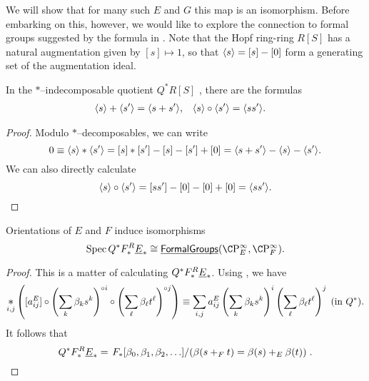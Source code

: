 We will show that for many such $E$ and $G$ this map is an isomorphism.  Before embarking on this, however, we would like to explore the connection to formal groups suggested by the formula in .  Note that the Hopf ring-ring $R[S]$ has a natural augmentation given by $[s] \mapsto 1$, so that $\langle s\rangle = [s] - [0]$ form a generating set of the augmentation ideal.
\begin{lemma}\label{ArithmeticInQAst}
In the $\ast$--indecomposable quotient $Q^* R[S]$ , there are the formulas
\begin{align*}
\langle s\rangle + \langle s'\rangle & = \langle s + s'\rangle, &
\langle s\rangle \circ \langle s'\rangle & = \langle s s'\rangle.
\end{align*}
\end{lemma}

\begin{proof}
Modulo $\ast$--decomposables, we can write  \[0 \equiv \langle s\rangle \ast \langle s'\rangle = [s] \ast [s'] - [s] - [s'] + [0] = \langle s + s'\rangle - \langle s\rangle - \langle s'\rangle.\]  We can also directly calculate \[\langle s\rangle \circ \langle s'\rangle = [s s'] - [0] - [0] + [0] = \langle s s'\rangle. \qedhere\]
\end{proof}

\begin{corollary}
Orientations of $E$ and $F$ induce isomorphisms
\[\Spec Q^* F_*^R \OS{E}{*} \cong \InternalHom{FormalGroups}(\CP^\infty_E, \CP^\infty_F).\]
\end{corollary}
\begin{proof}
This is a matter of calculating $Q^* F_*^R \underline{\smash{E}}_{*}$.  Using , we have \[\bigast_{i, j} \left([a_{ij}^E] \circ \left( \sum_k \beta_k s^k \right)^{\circ i} \circ \left( \sum_\ell \beta_\ell t^\ell \right)^{\circ j} \right) \equiv \sum_{i, j} a_{ij}^E \left( \sum_k \beta_k s^k \right)^i \left( \sum_\ell \beta_\ell t^\ell \right)^j \;\text{(in $Q^*$)}.\]  It follows that \[Q^* F_*^R \underline{\smash{E}}_{*} = \left. F_*[\beta_0, \beta_1, \beta_2, \ldots] \middle/ \left( \beta(s +_F t) = \beta(s) +_E \beta(t) \right) \right. . \qedhere\] 
\end{proof}

